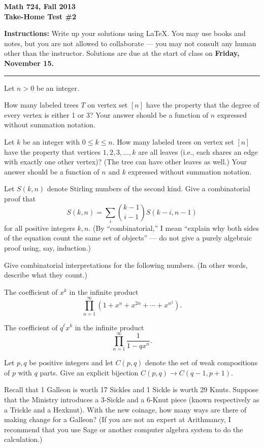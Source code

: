 

\thispagestyle{empty}

\bf Math 724, Fall 2013\\
Take-Home Test \#2\rm

{\bf Instructions:} Write up your solutions using LaTeX.  
You may use books and notes, but you are not allowed to collaborate ---
you may not consult any human other than the instructor.
Solutions are due at the start of class on {\bf Friday, November 15.}
\medskip\hrule\bigskip

\prob
Let $n>0$ be an integer.

How many labeled trees $T$ on vertex set $[n]$ have the property that the degree of every vertex is either 1 or 3?
Your answer should be a function of $n$ expressed without summation notation.

Let $k$ be an integer with $0\leq k\leq n$.  How many labeled trees on vertex set $[n]$ have the property that vertices $1,2,3,\dots,k$ are all leaves
(i.e., each shares an edge with exactly one other vertex)?  (The tree can have other leaves as well.)  Your answer should be a function of $n$ and $k$ expressed without summation notation.

\vfill{}
Let $S(k,n)$ denote Stirling numbers of the second kind.  Give a combinatorial proof that
\[S(k,n) = \sum_i \binom{k-1}{i-1} S(k-i,n-1)\]
for all positive integers $k,n$.  (By ``combinatorial,'' I mean ``explain why both sides of the equation count the same set of objects'' --- do not give a purely algebraic proof using, say, induction.)

\vfill\prob
Give combinatorial interpretations for the following numbers.  (In other words, describe what they count.)

 The coefficient of $x^k$ in the infinite product
\[\prod_{n=1}^\infty (1+x^n+x^{2n}+\cdots+x^{n^2}).\]

The coefficient of $q^\ell x^k$ in the infinite product
\[\prod_{n=1}^\infty \frac{1}{1-qx^n}.\]

\vfill{}
Let $p,q$ be positive integers and let $C(p,q)$ denote the set of weak compositions of $p$ with $q$ parts.  Give an explicit bijection $C(p,q)\to C(q-1,p+1)$.

\vfill{}
Recall that 1 Galleon is worth 17 Sickles and 1 Sickle is worth 29 Knuts.  Suppose that the Ministry introduces
a 3-Sickle and a 6-Knut piece (known respectively as a Trickle and a Hexknut).  With the new coinage,
how many ways are there of making change for a Galleon?  (If you are not an expert at Arithmancy, I recommend that you use Sage or another
computer algebra system to do the calculation.)


